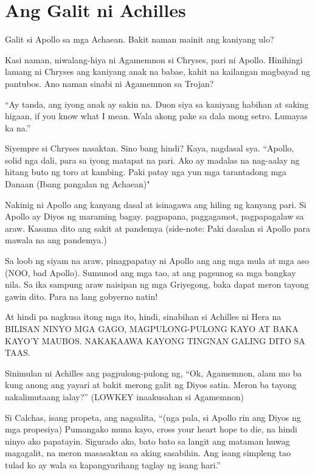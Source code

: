 \documentclass[12pt,letterpaper]{report}
\begin{document}
\chapter{Ang Galit ni Achilles}

Galit si Apollo sa mga Achaean. Bakit naman mainit ang kaniyang ulo?


Kasi naman, niwalang-hiya ni Agamemnon si Chryses, pari ni Apollo. Hinihingi lamang ni Chryses ang kaniyang anak na babae, kahit na kailangan magbayad ng pantubos. Ano naman sinabi ni Agamemnon sa Trojan?

``Ay tanda, ang iyong anak ay sakin na. Duon siya sa kaniyang habihan at saking higaan, if you know what I mean. Wala akong pake sa dala mong setro. Lumayas ka na.''

Siyempre si Chryses nasaktan. Sino bang hindi? Kaya, nagdasal sya. ``Apollo, solid nga dali, para sa iyong matapat na pari. Ako ay madalas na nag-aalay ng hitang buto ng toro at kambing. Paki patay nga yun mga tarantadong mga Danaan (Ibang pangalan ng Achaean)"

Nakinig ni Apollo ang kanyang dasal at isinagawa ang hiling ng kanyang pari. Si Apollo ay Diyos ng maraming bagay. pagpapana, paggagamot, pagpapagalaw sa araw. Kasama dito ang sakit at pandemya (side-note: Paki dasalan si Apollo para mawala na ang pandemya.)

Sa loob ng siyam na araw, pinagpapatay ni Apollo ang ang mga mula at mga aso (NOO, bad Apollo). Sumunod ang mga tao, at ang pagsunog sa mga bangkay nila. Sa ika sampung araw naisipan ng mga Griyegong, baka dapat meron tayong gawin dito. Para na lang gobyerno natin!

At hindi pa nagkusa itong mga ito, hindi, sinabihan si Achilles ni Hera na BILISAN NINYO MGA GAGO, MAGPULONG-PULONG KAYO AT BAKA KAYO'Y MAUBOS. NAKAKAAWA KAYONG TINGNAN GALING DITO SA TAAS.

Sinimulan ni Achilles ang pagpulong-pulong ng, ``Ok, Agamemnon, alam mo ba kung anong ang yayari at bakit merong galit ng Diyos satin. Meron ba tayong nakalimutaang ialay?'' (LOWKEY inaakusahan si Agamemnon)

Si Calchas, isang propeta, ang nagsalita, ``(nga pala, si Apollo rin ang Diyos ng mga propesiya) Pumangako muna kayo, cross your heart hope to die, na hindi ninyo ako papatayin. Sigurado ako, bato bato sa langit ang mataman huwag magagalit, na meron masasaktan sa aking sasabihin. Ang isang simpleng tao tulad ko ay wala sa kapangyarihang taglay ng isang hari.''
\end{document}
